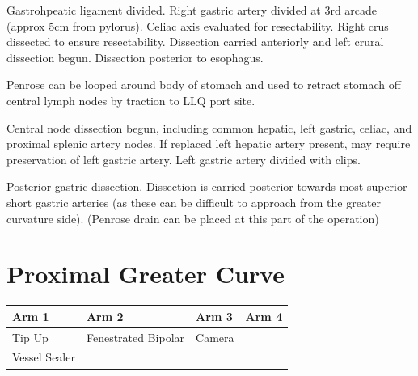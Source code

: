 \documentclass[
  letterpaper,
]{scrbook}
\begin{document}
Gastrohpeatic ligament divided. Right gastric artery divided at 3rd
arcade (approx 5cm from pylorus). Celiac axis evaluated for
resectability. Right crus dissected to ensure resectability. Dissection
carried anteriorly and left crural dissection begun. Dissection
posterior to esophagus.

Penrose can be looped around body of stomach and used to retract stomach
off central lymph nodes by traction to LLQ port site.

Central node dissection begun, including common hepatic, left gastric,
celiac, and proximal splenic artery nodes. If replaced left hepatic
artery present, may require preservation of left gastric artery. Left
gastric artery divided with clips.

Posterior gastric dissection. Dissection is carried posterior towards
most superior short gastric arteries (as these can be difficult to
approach from the greater curvature side). (Penrose drain can be placed
at this part of the operation)

\section{Proximal Greater Curve}\label{proximal-greater-curve-1}

\begin{longtable}[]{@{}
  >{\raggedright\arraybackslash}p{}
  >{\raggedright\arraybackslash}p{}
  >{\raggedright\arraybackslash}p{}
  >{\raggedright\arraybackslash}p{}@{}}
\toprule\noalign{}
\begin{minipage}[b]{\linewidth}\raggedright
Arm 1
\end{minipage} & \begin{minipage}[b]{\linewidth}\raggedright
Arm 2
\end{minipage} & \begin{minipage}[b]{\linewidth}\raggedright
Arm 3
\end{minipage} & \begin{minipage}[b]{\linewidth}\raggedright
Arm 4
\end{minipage} \\
\midrule\noalign{}
\endhead
\bottomrule\noalign{}
\endlastfoot
Tip Up & Fenestrated Bipolar & Camera &
\begin{minipage}[t]{\linewidth}\raggedright
Synchroseal\\
Vessel Sealer\strut
\end{minipage} \\
\end{longtable}
\end{document}

